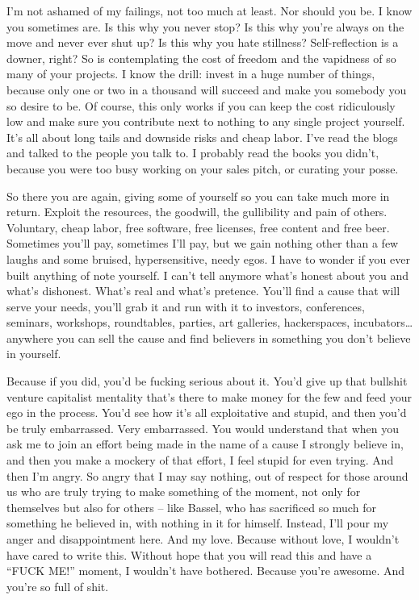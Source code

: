 I'm not ashamed of my failings, not too much at least. Nor should you
be. I know you sometimes are. Is this why you never stop? Is this why
you're always on the move and never ever shut up? Is this why you hate
stillness? Self-reflection is a downer, right? So is contemplating the
cost of freedom and the vapidness of so many of your projects. I know
the drill: invest in a huge number of things, because only one or two in
a thousand will succeed and make you somebody you so desire to be. Of
course, this only works if you can keep the cost ridiculously low and
make sure you contribute next to nothing to any single project yourself.
It's all about long tails and downside risks and cheap labor. I've read
the blogs and talked to the people you talk to. I probably read the
books you didn't, because you were too busy working on your sales pitch,
or curating your posse.

So there you are again, giving some of yourself so you can take much
more in return. Exploit the resources, the goodwill, the gullibility and
pain of others. Voluntary, cheap labor, free software, free licenses,
free content and free beer. Sometimes you'll pay, sometimes I'll pay,
but we gain nothing other than a few laughs and some bruised,
hypersensitive, needy egos. I have to wonder if you ever built anything
of note yourself. I can't tell anymore what's honest about you and
what's dishonest. What's real and what's pretence. You'll find a cause
that will serve your needs, you'll grab it and run with it to investors,
conferences, seminars, workshops, roundtables, parties, art galleries,
hackerspaces, incubators\ldots{} anywhere you can sell the cause and
find believers in something you don't believe in yourself.

Because if you did, you'd be fucking serious about it. You'd give up
that bullshit venture capitalist mentality that's there to make money
for the few and feed your ego in the process. You'd see how it's all
exploitative and stupid, and then you'd be truly embarrassed. Very
embarrassed. You would understand that when you ask me to join an effort
being made in the name of a cause I strongly believe in, and then you
make a mockery of that effort, I feel stupid for even trying. And then
I'm angry. So angry that I may say nothing, out of respect for those
around us who are truly trying to make something of the moment, not only
for themselves but also for others -- like Bassel, who has sacrificed so
much for something he believed in, with nothing in it for himself.
Instead, I'll pour my anger and disappointment here. And my love.
Because without love, I wouldn't have cared to write this. Without hope
that you will read this and have a ``FUCK ME!'' moment, I wouldn't have
bothered. Because you're awesome. And you're so full of shit.
